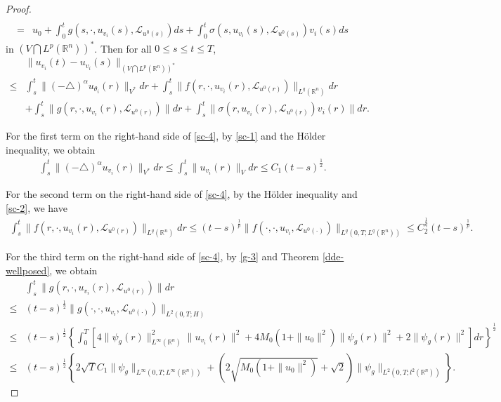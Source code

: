 \documentclass[10pt,a4paper]{amsart}
\def\leq{\leqslant}
\begin{document}
\begin{proof}
\begin{align}
        \nonumber \\
        = & u_0
        + \int_0^t g(s, \cdot, u_{v_i}(s), \mathcal{L}_{u^0(s)} ) ds
        + \int_0^t \sigma(s, u_{v_i}(s), \mathcal{L}_{u^0(s)} ) v_i(s) ds
    \end{align}
    in $  \left( V \bigcap L^p(\mathbb{R}^n) \right)^\ast$.
    Then for all $0 \leq s \leq t \leq T$,
    \begin{align} \label{sc-4}
        & \| u_{v_i} (t) - u_{v_i} (s) \|_{\left( V \bigcap L^p(\mathbb{R}^n) \right)^\ast}
        \nonumber \\
        \leq & \int_s^t \| (-\triangle)^{\alpha} u_{\theta_i}(r) \|_{V^\ast} dr
        + \int_s^t \| f( r, \cdot, u_{v_i}(r), \mathcal{L}_{u^0(r)} ) \|_{L^q(\mathbb{R}^n)} dr
        \nonumber \\
        & + \int_s^t \| g(r, \cdot, u_{v_i}(r), \mathcal{L}_{u^0(r)} ) \| dr
        + \int_s^t \| \sigma(r, u_{v_i}(r), \mathcal{L}_{u^0(r)} ) v_i(r) \| dr.
    \end{align}


    For the first term on the right-hand side of \eqref{sc-4},
    by
    \eqref{sc-1}
    and the H\"{o}lder inequality,
    we obtain
    \begin{align} \label{sc-5}
        \int_s^t \| (-\triangle)^{\alpha} u_{v_i}(r) \|_{V^\ast} dr
        \leq \int_s^t \| u_{v_i}(r) \|_{V} dr
        \leq C_1 (t-s)^{\frac{1}{2}}.
    \end{align}

    For the second term on the right-hand side of \eqref{sc-4},
    by the H\"{o}lder inequality and \eqref{sc-2}, we have
    \begin{align} \label{sc-6}
        \int_s^t \| f( r, \cdot, u_{v_i}(r), \mathcal{L}_{u^0(r)} ) \|_{L^q(\mathbb{R}^n)} dr
        \leq (t-s)^{\frac{1}{p}} \| f( \cdot, \cdot, u_{v_i}, \mathcal{L}_{u^0(\cdot)} ) \|_{ L^q( 0, T; L^q(\mathbb{R}^n) ) }
        \leq C_2^{\frac{1}{q}} (t-s)^{\frac{1}{p}}.
    \end{align}

    For the third term on the right-hand side of \eqref{sc-4},
    by \eqref{g-3}  and Theorem \ref{dde-wellposed}, we obtain
    \begin{align} \label{sc-7}
        & \int_s^t \| g(r, \cdot, u_{v_i}(r), \mathcal{L}_{u^0(r)} ) \| dr
        \nonumber \\
        \leq & (t-s)^{\frac{1}{2}} \| g(\cdot, \cdot, u_{v_i}, \mathcal{L}_{u^0(\cdot)} ) \|_{ L^2(0, T; H) }
        \nonumber \\
        \leq & (t-s)^{\frac{1}{2}}
        \left\{
        \int_0^T
        \left[ 4 \| \psi_g(r) \|_{L^\infty(\mathbb{R}^n) }^2
        \|  u_{v_i} (r) \|^2 +
        4 M_0( 1 + \|u_0\|^2 )
        \| \psi_g(r)\|^2
        + 2 \| \psi_g(r) \|^2
        \right]
        dr
        \right\}^{\frac{1}{2}}
        \nonumber \\
        \leq & (t-s)^{\frac{1}{2}}
        \left\{ 2 \sqrt{T} C_1 \| \psi_g \|_{L^\infty(0,T; L^\infty(\mathbb{R}^n) ) }
        + (2 \sqrt{M_0( 1 + \|u_0\|^2 )}
        + \sqrt{2}) \| \psi_g \|_{L^2(0,T; l^2(\mathbb{R}^n) ) }
        \right\}.
    \end{align}


\end{proof}
\end{document}
